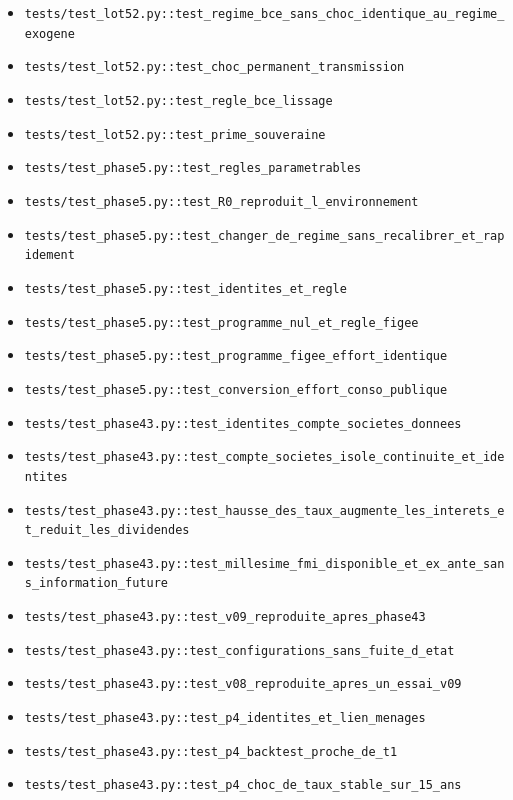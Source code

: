 \documentclass[
  11pt,
  11pt,
  a4paper,
  openany]{book}
\begin{document}
\begin{itemize}
\item
  \texttt{tests/test\_lot52.py::test\_regime\_bce\_sans\_choc\_identique\_au\_regime\_exogene}
\item
  \texttt{tests/test\_lot52.py::test\_choc\_permanent\_transmission}
\item
  \texttt{tests/test\_lot52.py::test\_regle\_bce\_lissage}
\item
  \texttt{tests/test\_lot52.py::test\_prime\_souveraine}
\item
  \texttt{tests/test\_phase5.py::test\_regles\_parametrables}
\item
  \texttt{tests/test\_phase5.py::test\_R0\_reproduit\_l\_environnement}
\item
  \texttt{tests/test\_phase5.py::test\_changer\_de\_regime\_sans\_recalibrer\_et\_rapidement}
\item
  \texttt{tests/test\_phase5.py::test\_identites\_et\_regle}
\item
  \texttt{tests/test\_phase5.py::test\_programme\_nul\_et\_regle\_figee}
\item
  \texttt{tests/test\_phase5.py::test\_programme\_figee\_effort\_identique}
\item
  \texttt{tests/test\_phase5.py::test\_conversion\_effort\_conso\_publique}
\item
  \texttt{tests/test\_phase43.py::test\_identites\_compte\_societes\_donnees}
\item
  \texttt{tests/test\_phase43.py::test\_compte\_societes\_isole\_continuite\_et\_identites}
\item
  \texttt{tests/test\_phase43.py::test\_hausse\_des\_taux\_augmente\_les\_interets\_et\_reduit\_les\_dividendes}
\item
  \texttt{tests/test\_phase43.py::test\_millesime\_fmi\_disponible\_et\_ex\_ante\_sans\_information\_future}
\item
  \texttt{tests/test\_phase43.py::test\_v09\_reproduite\_apres\_phase43}
\item
  \texttt{tests/test\_phase43.py::test\_configurations\_sans\_fuite\_d\_etat}
\item
  \texttt{tests/test\_phase43.py::test\_v08\_reproduite\_apres\_un\_essai\_v09}
\item
  \texttt{tests/test\_phase43.py::test\_p4\_identites\_et\_lien\_menages}
\item
  \texttt{tests/test\_phase43.py::test\_p4\_backtest\_proche\_de\_t1}
\item
  \texttt{tests/test\_phase43.py::test\_p4\_choc\_de\_taux\_stable\_sur\_15\_ans}
\end{itemize}
\end{document}
